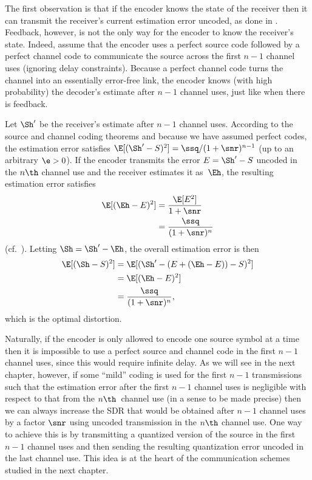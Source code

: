 The first observation is that if the encoder knows the state of the receiver
then it can transmit the receiver's current estimation error uncoded, as done in
. Feedback, however, is not the only way for the encoder to know
the receiver's state. Indeed, assume that the encoder uses a perfect source code
followed by a perfect channel code to communicate the source across the first
$n-1$ channel uses (ignoring delay constraints). Because a perfect channel code
turns the channel into an essentially error-free link, the encoder knows (with
high probability) the decoder's estimate after $n-1$ channel uses, just like
when there is feedback.

Let $\Sh'$ be the receiver's estimate after $n-1$ channel uses. According to the
source and channel coding theorems and because we have assumed perfect codes,
the estimation error satisfies $\E[(\Sh' - S)^2] = \ssq / (1 + \snr)^{n-1}$ (up
to an arbitrary $\e > 0$). If the encoder transmits the error $E = \Sh' - S$
uncoded in the $n\th$ channel use and the receiver estimates it as~$\Eh$, the
resulting estimation error satisfies
\begin{align*}
  \E[(\Eh - E)^2] &= \frac{\E[E^2]}{ 1 + \snr } \\
  &= \frac{\ssq}{(1 + \snr)^n}
\end{align*}
(cf.~).
Letting $\Sh = \Sh' - \Eh$, the overall estimation error is then 
\begin{align*}
  \E[(\Sh - S)^2] &= \E[(\Sh' - (E + (\Eh - E)) - S)^2] \\
  &= \E[(\Eh - E)^2] \\
  &= \frac{\ssq}{(1 + \snr)^n},
\end{align*}
which is the optimal distortion. 

Naturally, if the encoder is only allowed to encode one source symbol at a time
then it is impossible to use a perfect source and channel code in the first
$n-1$ channel uses, since this would require infinite delay. As we will see in
the next chapter, however, if some ``mild'' coding is used for the first $n-1$
transmissions such that the estimation error after the first $n-1$ channel uses
is negligible with respect to that from the $n\th$~channel use (in a sense to be
made precise) then we can always increase the SDR that would be obtained after
$n-1$ channel uses by a factor $\snr$ using uncoded transmission in the $n\th$
channel use. One way to achieve this is by transmitting a quantized version of
the source in the first $n-1$ channel uses and then sending the resulting
quantization error uncoded in the last channel use. This idea is at the heart of
the communication schemes studied in the next chapter.
